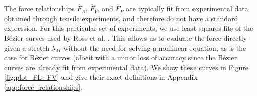 \documentclass{sfuthesis}
\numberwithin{equation}{section}
\numberwithin{figure}{chapter}
\numberwithin{table}{chapter}
\theoremstyle{definition}
\begin{document}

The force relationships $\widehat{F}_A$, $\widehat{F}_V$, and $\widehat{F}_P$ are typically fit from experimental data obtained through tensile experiments, and therefore do not have a standard expression. For this particular set of experiments, we use least-squares fits of the B\'{e}zier curves used by Ross et al. \cite{RossWakeling2016Multibody}. This allows us to evaluate the force directly given a stretch $\lambda_M$ without the need for solving a nonlinear equation, as is the case for B\'{e}zier curves (albeit with a minor loss of accuracy since the B\'{e}zier curves are already fit from experimental data). 
We show these curves in Figure \ref{fig:plot_FL_FV} and give their exact definitions in Appendix \ref{app:force_relationships}.
\end{document}
